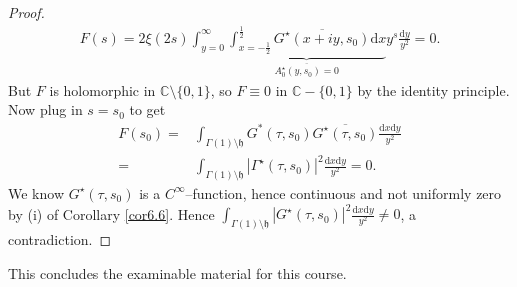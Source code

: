 \documentclass{article}
\theoremstyle{definition}
\begin{document}
\begin{proof}
    \begin{align*}
        F(s) = 2\xi(2s)\int_{y=0}^{\infty} \underbrace{\int_{x=-\frac{1}{2}}^{\frac{1}{2}} \overline{G^\star(x+iy,s_0)}\mathrm{d}x}_{\overline{A_0^\star(y,s_0) = 0}}y^s\frac{\mathrm{d}y}{y^2} = 0.
    \end{align*} 
    But $F$ is holomorphic in $\mathbb{C}\setminus \{0,1\}$, so $F \equiv 0$ in $\mathbb{C} - \{0,1\}$ by the identity principle. Now plug in $s = s_0$ to get
    \begin{align*}
        F(s_0) =& \int_{\Gamma(1)\setminus \mathfrak{h}}^{} G^*(\tau,s_0)\overline{G^\star(\tau,s_0)}\frac{\mathrm{d}x\mathrm{d}y}{y^2} \\
        =& \int_{\Gamma(1)\setminus \mathfrak{h}}^{} |\Gamma^\star(\tau,s_0)|^2\frac{\mathrm{d}x\mathrm{d}y}{y^2} = 0.
    \end{align*}
    We know $G^\star(\tau,s_0)$ is a $C^{\infty}$--function, hence continuous and not uniformly zero by (i) of Corollary \ref{cor6.6}. Hence $\int_{\Gamma(1)\setminus \mathfrak{h}}^{} |G^\star(\tau,s_0)|^2 \frac{\mathrm{d}x\mathrm{d}y}{y^2} \neq 0$, a contradiction.
\end{proof}

This concludes the examinable material for this course.
\end{document}
